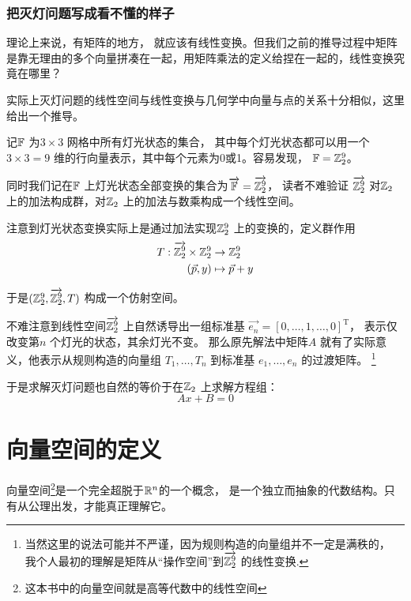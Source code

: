 \subsubsection{把灭灯问题写成看不懂的样子}
理论上来说，有矩阵的地方，
就应该有线性变换。但我们之前的推导过程中矩阵是靠无理由的多个向量拼凑在一起，用矩阵乘法的定义给捏在一起的，线性变换究竟在哪里？

实际上灭灯问题的线性空间与线性变换与几何学中向量与点的关系十分相似，这里给出一个推导。

记\(\mathbb{F}\) 为\(3 \times 3\) 网格中所有灯光状态的集合，
其中每个灯光状态都可以用一个\(3 \times 3=9\) 维的行向量表示，其中每个元素为0或1。容易发现，
\(\mathbb{F}=\mathbb{Z}_{2}^{9}\)。

同时我们记在\(\mathbb{F}\)
上灯光状态全部变换的集合为\(\overrightarrow{\mathbb{F}}=\overrightarrow{\mathbb{Z}_{2}^{9}}\)，
读者不难验证 \(\overrightarrow{\mathbb{Z}_{2}^{9}}\)
对\(\mathbb{Z}_{2}\)上的加法构成群，对\(\mathbb{Z}_{2}\) 上的加法与数乘构成一个线性空间。

注意到灯光状态变换实际上是通过加法实现\(\mathbb{Z}^{9}_{2}\) 上的变换的，定义群作用
\begin{align*}
    T: \overrightarrow{\mathbb{Z}_{2}^{9}} \times
    \mathbb{Z}_{2}^{9} &\to \mathbb{Z}_{2}^{9}\\
    (\vec{p},y) &\mapsto \vec{p}+y
\end{align*}

于是\((\mathbb{Z}^{9}_{2}, \overrightarrow{\mathbb{Z}^{9}_{2}}, T)\) 构成一个仿射空间。

不难注意到线性空间\(\overrightarrow{\mathbb{Z}^{9}_{2}}\) 上自然诱导出一组标准基
\(\overrightarrow{e_{n}}=[0,\dots,1,\dots,0]^{\mathrm{T}}\)，
表示仅改变第\(n\) 个灯光的状态，其余灯光不变。 那么原先解法中矩阵\(A\) 就有了实际意义，他表示从规则构造的向量组
\({T_{1}, \dots, T_{n}}\) 到标准基 \({e_{1}, \dots, e_{n}}\) 的过渡矩阵。
\footnote{当然这里的说法可能并不严谨，因为规则构造的向量组并不一定是满秩的，
我个人最初的理解是矩阵从``操作空间''到\(\overrightarrow{\mathbb{Z}^{9}_{2}}\) 的线性变换.}

于是求解灭灯问题也自然的等价于在\(\mathbb{Z}_{2}\) 上求解方程组：
\[
    Ax+B=0
\]

\section{向量空间的定义}
向量空间\footnote{这本书中的向量空间就是高等代数中的线性空间}是一个完全超脱于\(\mathbb{R}^{n}\)的一个概念，
是一个独立而抽象的代数结构。只有从公理出发，才能真正理解它。

